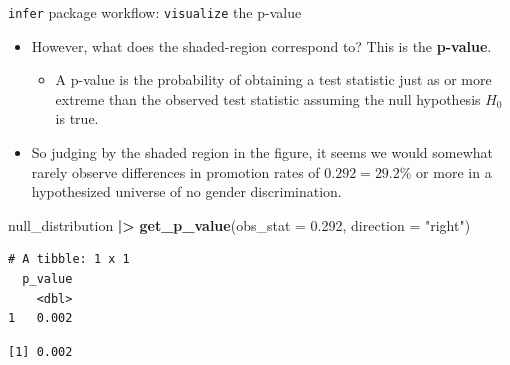 \documentclass[
  ignorenonframetext,
]{beamer}
\newenvironment{Shaded}{\begin{snugshade}}{\end{snugshade}}
\newcommand{\AttributeTok}[1]{\textcolor[rgb]{0.13,0.29,0.53}{#1}}
\newcommand{\CommentTok}[1]{\textcolor[rgb]{0.56,0.35,0.01}{\textit{#1}}}
\newcommand{\FloatTok}[1]{\textcolor[rgb]{0.00,0.00,0.81}{#1}}
\newcommand{\FunctionTok}[1]{\textcolor[rgb]{0.13,0.29,0.53}{\textbf{#1}}}
\newcommand{\NormalTok}[1]{#1}
\newcommand{\SpecialCharTok}[1]{\textcolor[rgb]{0.81,0.36,0.00}{\textbf{#1}}}
\newcommand{\StringTok}[1]{\textcolor[rgb]{0.31,0.60,0.02}{#1}}
\providecommand{\tightlist}{%
  \setlength{\itemsep}{0pt}\setlength{\parskip}{0pt}}
\begin{document}
\begin{frame}[fragile]{\texttt{infer} package workflow:
\texttt{visualize} the p-value}
\label{infer-package-workflow-visualize-the-p-value-1}
\begin{itemize}
\item
  However, what does the shaded-region correspond to? This is the
  \textbf{p-value}.

  \begin{itemize}
  \tightlist
  \item
    A p-value is the probability of obtaining a test statistic just as
    or more extreme than the observed test statistic assuming the null
    hypothesis \(H_0\) is true.
  \end{itemize}
\item
  So judging by the shaded region in the figure, it seems we would
  somewhat rarely observe differences in promotion rates of
  \(0.292 = 29.2\%\) or more in a hypothesized universe of no gender
  discrimination.
\end{itemize}

\tiny

\begin{Shaded}
\begin{Highlighting}[]
\NormalTok{null\_distribution }\SpecialCharTok{|\textgreater{}} 
  \FunctionTok{get\_p\_value}\NormalTok{(}\AttributeTok{obs\_stat =} \FloatTok{0.292}\NormalTok{, }\AttributeTok{direction =} \StringTok{"right"}\NormalTok{) }
\end{Highlighting}
\end{Shaded}

\begin{verbatim}
# A tibble: 1 x 1
  p_value
    <dbl>
1   0.002
\end{verbatim}

\begin{Shaded}
\end{Shaded}

\begin{verbatim}
[1] 0.002
\end{verbatim}

\normalsize
\end{frame}
\end{document}
